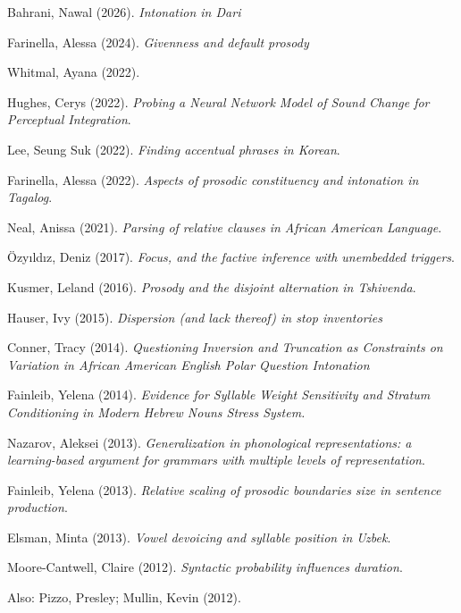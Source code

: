 \documentclass[10pt]{article}
\newcommand{\halfblankline}{\quad\vspace{-0.5\baselineskip}\pagebreak[3]}
\begin{document}
\begin{innerlist}
\item Bahrani, Nawal (2026). \emph{Intonation in Dari}
\item Farinella, Alessa (2024). \emph{Givenness and default prosody}
  \item Whitmal, Ayana (2022).
  \item Hughes, Cerys (2022). \emph{Probing a Neural Network Model of Sound Change for Perceptual Integration}.
  \item Lee, Seung Suk (2022). \emph{Finding accentual phrases in Korean}.
\item Farinella, Alessa (2022). \emph{Aspects of prosodic constituency and intonation in Tagalog}.
  \item Neal, Anissa (2021). \emph{Parsing of relative clauses in {A}frican {A}merican {L}anguage}.
  \item \"{O}zy\i{}ld\i{}z, Deniz (2017). \emph{Focus, and the factive inference with unembedded triggers}.
    \item Kusmer, Leland (2016). \emph{Prosody and the disjoint alternation in Tshivenda}.
    \item Hauser, Ivy (2015). \emph{Dispersion (and lack thereof) in stop inventories}
    \item Conner, Tracy (2014). \emph{Questioning Inversion and
        Truncation as Constraints on Variation in African American English Polar Question Intonation}
    \item Fainleib, Yelena (2014). \emph{Evidence for Syllable Weight Sensitivity and Stratum Conditioning in Modern Hebrew Nouns Stress System.}
    \item Nazarov, Aleksei (2013). \emph{Generalization in phonological representations: a learning-based argument for grammars with multiple levels of representation}.
    \item Fainleib, Yelena (2013). \emph{Relative scaling of prosodic boundaries size in sentence production}.
    \item Elsman, Minta (2013). \emph{Vowel devoicing and syllable position in Uzbek}.
    \item Moore-Cantwell, Claire (2012). \emph{Syntactic probability
        influences duration}.
    \item Also: Pizzo, Presley; Mullin, Kevin (2012).
\end{innerlist}

\halfblankline
\end{document}
